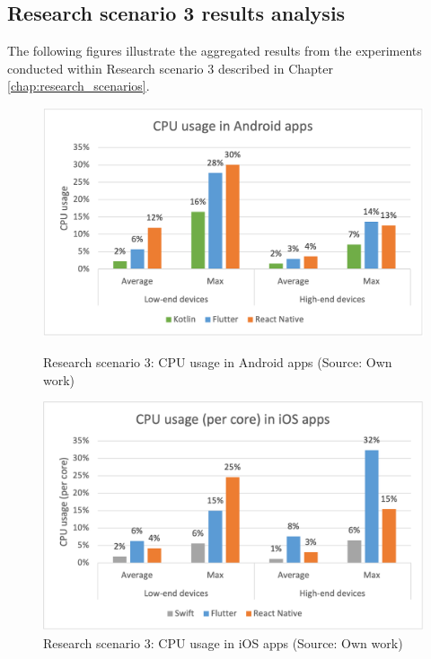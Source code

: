 
\subsection{Research scenario 3 results analysis}

The following figures illustrate the aggregated results from the experiments conducted within Research scenario 3 described in Chapter \ref{chap:research_scenarios}.

\begin{figure}[H]
    \begin{minipage}{.48\textwidth}
        \includegraphics[width=\textwidth]{img/scenario3_cpu_android}
        \caption{Research scenario 3: CPU usage in Android apps (Source: Own work)}
        \label{fig:s3_cpu_android}
    \end{minipage}
    \hfill
    \begin{minipage}{.48\textwidth}
        \includegraphics[width=\textwidth]{img/scenario3_cpu_ios}
        \caption{Research scenario 3: CPU usage in iOS apps (Source: Own work)}
        \label{fig:s3_cpu_ios}
    \end{minipage}
\end{figure}

